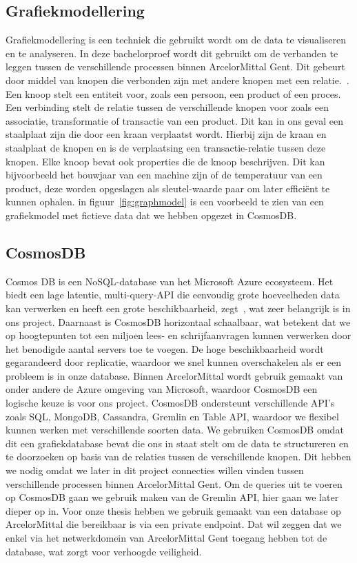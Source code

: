 \subsection{Grafiekmodellering}
Grafiekmodellering is een techniek die gebruikt wordt om de data te visualiseren en te analyseren. In deze bachelorproef wordt dit gebruikt om de verbanden te leggen tussen de verschillende processen binnen ArcelorMittal Gent.
Dit gebeurt door middel van knopen die verbonden zijn met andere knopen met een relatie.~\autocite{neo4j20252}.
Een knoop stelt een entiteit voor, zoals een persoon, een product of een proces. Een verbinding stelt de relatie tussen de verschillende knopen voor zoals een associatie, transformatie of transactie van een product.
Dit kan in ons geval een staalplaat zijn die door een kraan verplaatst wordt. Hierbij zijn de kraan en staalplaat de knopen en is de verplaatsing een transactie-relatie tussen deze knopen.
Elke knoop bevat ook properties die de knoop beschrijven. Dit kan bijvoorbeeld het bouwjaar van een machine zijn of de temperatuur van een product, deze worden opgeslagen als sleutel-waarde paar om later efficiënt te kunnen ophalen.
in figuur~\ref{fig:graphmodel} is een voorbeeld te zien van een grafiekmodel met fictieve data dat we hebben opgezet in CosmosDB.\@

\subsection{CosmosDB}
Cosmos DB is een NoSQL-database van het Microsoft Azure ecosysteem. Het biedt een lage latentie, multi-query-API die eenvoudig grote hoeveelheden data kan verwerken en heeft een grote beschikbaarheid, zegt~\textcite{Put2020}, wat zeer belangrijk is in ons project.
Daarnaast is CosmosDB horizontaal schaalbaar, wat betekent dat we op hoogtepunten tot een miljoen lees- en schrijfaanvragen kunnen verwerken door het benodigde aantal servers toe te voegen.
De hoge beschikbaarheid wordt gegarandeerd door replicatie, waardoor we snel kunnen overschakelen als er een probleem is in onze database.
Binnen ArcelorMittal wordt gebruik gemaakt van onder andere de Azure omgeving van Microsoft, waardoor CosmosDB een logische keuze is voor ons project.
CosmosDB ondersteunt verschillende API's zoals SQL, MongoDB, Cassandra, Gremlin en Table API, waardoor we flexibel kunnen werken met verschillende soorten data.
We gebruiken CosmosDB omdat dit een grafiekdatabase bevat die ons in staat stelt om de data te structureren en te doorzoeken op basis van de relaties tussen de verschillende knopen.
Dit hebben we nodig omdat we later in dit project connecties willen vinden tussen verschillende processen binnen ArcelorMittal Gent.
Om de queries uit te voeren op CosmosDB gaan we gebruik maken van de Gremlin API, hier gaan we later dieper op in.
Voor onze thesis hebben we gebruik gemaakt van een database op ArcelorMittal die bereikbaar is via een private endpoint.
Dat wil zeggen dat we enkel via het netwerkdomein van ArcelorMittal Gent toegang hebben tot de database, wat zorgt voor verhoogde veiligheid.

